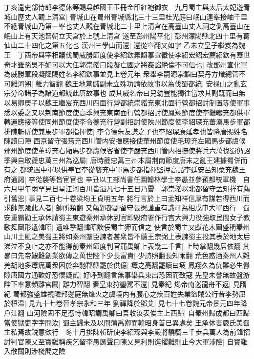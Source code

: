 丁亥遣吏部侍郎李德休等賜吳越國王玉冊金印紅袍御衣　九月蜀主與太后太妃遊青城山歷丈人觀上清宫|{
	青城山在蜀州青城縣北三十三里杜光庭曰岷山連峯接岫千里不絶青城山乃第一峯也丈人觀在青城北二十里上清宫在高臺山丈人祠之側高臺山在岷山上有天池晉朝立天宫於上號上清宫}
遂至彭州陽平化|{
	彭州濛陽縣北四十里有葛仙山二十四化之第五化也}
漢州三學山而還|{
	還從宣翻又如字}
乙未立皇子繼岌為魏王　丁酉帝與宰相議伐蜀威勝節度使李紹欽素諂事宣徽使李紹宏紹宏薦紹欽有蓋世奇才雖孫吳不如可以大任郭崇韜曰段凝亡國之將姦諂絶倫不可信也|{
	改鄧州宣化軍為威勝軍段凝降賜姓名李紹欽事並見上卷元年}
衆舉李嗣源崇韜曰契丹方熾總管不可離河朔|{
	離力智翻}
魏王地當儲副未立殊功請依故事以為伐蜀都統|{
	安禄山之亂玄宗分命諸子為諸道都統此唐故事也}
成其威名帝曰兒幼豈能獨往當求其副既而曰無以易卿庚子以魏王繼岌充西川四面行營都統崇韜充東北面行營都招討制置等使軍事悉以委之又以荆南節度使高季興充東南面行營都招討使鳳翔節度使李繼曮充都供軍轉運應接等使同州節度使李令德充行營副招討使陜州節度使李紹琛充蕃漢馬步軍都排陳斬斫使兼馬步軍都指揮使|{
	李令德朱友謙之子也李紹琛康延孝也皆降唐賜姓名陳讀曰陣}
西京留守張筠充西川管内安撫應接使華州節度使毛璋充左廂馬步都虞候邠州節度使董璋充右廂馬步都虞候客省使李嚴充西川管内招撫使將兵六萬伐蜀仍詔季興自取夔忠萬三州為巡屬|{
	唐時夔忠萬三州本屬荆南節度唐末之亂王建據蜀併而有之}
都統置中軍以供奉官李從襲充中軍馬步都指揮監押高品李廷安呂知柔充魏王府通謁|{
	李從襲等皆宦官也}
辛丑以工部尚書任圜翰林學士李愚並參預都統軍機　自六月甲午雨罕見日星江河百川皆溢凡七十五日乃霽　郭崇韜以北都留守孟知祥有薦引舊恩|{
	事見二百七十卷梁均王貞明五年}
將行言於上曰孟知祥信厚有謀若得西川而求帥無踰此人者|{
	帥所類翻}
又薦鄴都副留守張憲謹重有識可為相戊申大軍西行　蜀安重霸勸王承休請蜀主東遊秦州承休到官即毁府署作行宫大興力役強取民間女子教歌舞圖形遺韓昭|{
	遺唯季翻韓昭諛佞蜀主狎而信之}
使言於蜀主又獻花木圖盛稱秦州山川土風之美蜀主將如秦州羣臣諫者甚衆皆不聽王宗弼上表諫蜀主投其表於地太后涕泣不食止之亦不能得前秦州節度判官蒲禹卿上表幾二千言|{
	上時掌翻幾居依翻}
其畧曰先帝艱難創業欲傳之萬世陛下少長富貴|{
	少詩照翻長知兩翻}
荒色惑酒秦州人雜羌胡地多瘴癘萬衆困於奔馳郡縣罷於供億|{
	瘴之亮翻罷讀曰疲}
鳳翔久為仇讎必生釁隙唐國方通歡好恐懷疑貳|{
	好呼到翻言無事舉兵東出恐因而致寇}
先皇未嘗無故盤游陛下率意頻離宫闕|{
	離力智翻}
秦皇東狩鑾駕不還|{
	見秦紀}
煬帝南巡龍舟不返|{
	見隋紀}
蜀都強盛雄視隣邦邊庭無烽火之虞境内有腹心之疾百姓失業盜賊公行昔李勢屈於桓温|{
	見九十七卷晉孝宗永和三年}
劉禪降於鄧艾|{
	見七十七卷魏元帝景元四年降戶江翻}
山河險固不足憑恃韓昭謂禹卿曰吾收汝表俟主上西歸|{
	自秦州歸成都曰西歸}
當使獄吏字字問汝|{
	蜀主歸未及以問蒲禹卿而韓昭身首已異處矣}
王承休妻嚴氏美蜀主私焉故鋭意欲行　冬十月排陳斬斫使李紹琛與李嚴將驍騎三千步兵萬人為前鋒招討判官陳乂至寶雞稱疾乞留李愚厲聲曰陳乂見利則進懼難則止今大軍涉險|{
	自寶雞入散關則涉棧閣之險}

